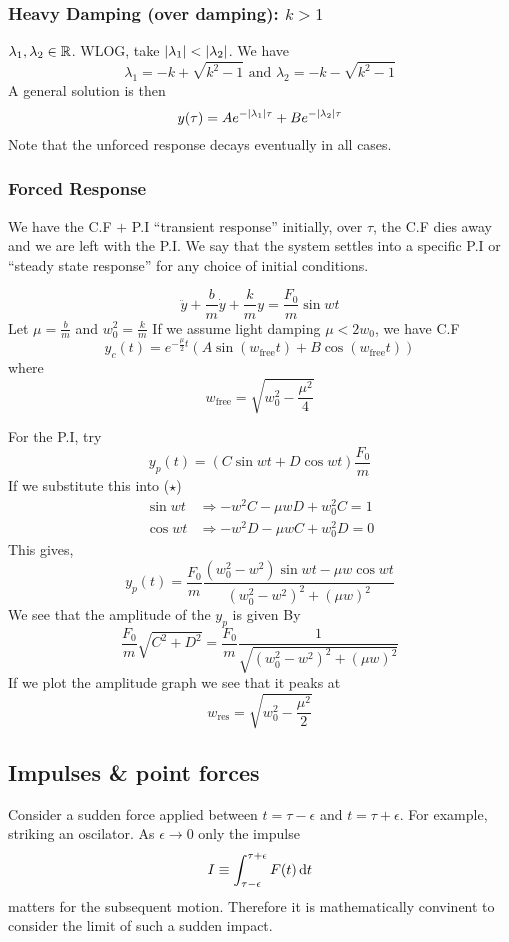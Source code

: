 \documentclass{article}
\begin{document}
\subsubsection*{Heavy Damping (over damping): $k > 1$}
$\lambda_1, \lambda_2 \in \mathbb{R}$. WLOG, take $\left\lvert \lambda_1\right\rvert < \left\lvert \lambda_2\right\rvert$. We have
\[
    \lambda_1 = -k + \sqrt{k^2 - 1} \text{ and } \lambda_2 = -k - \sqrt{k^2 - 1}
\]
A general solution is then
\[
    y(\tau) = A e^{- \left\lvert \lambda_1\right\rvert \tau} + B e^{- \left\lvert \lambda_2\right\rvert \tau}
\]
Note that the unforced response decays eventually in all cases.
\subsubsection{Forced Response}
We have the C.F $+$ P.I ``transient response'' initially, over $\tau$,
the C.F dies away and we are left with the P.I. 
We say that the system settles into a specific P.I or ``steady state response'' for any choice of initial conditions.

\begin{eg}
    \[
        \ddot{y} + \frac{b}{m} \dot{y} + \frac{k}{m} y = \frac{F_0}{m} \sin wt \tag{$\star$} 
    \]
    Let $\mu = \frac{b}{m}$ and $w_0^2 = \frac{k}{m}$
    If we assume light damping $\mu < 2 w_0$, we have C.F
    \[
        y_c(t) = e^{-\frac{\mu}{2}t} (A \sin (w_{\text{free}} t) + B \cos (w_{\text{free}} t))   
    \]
    where
    \[
        w_{\text{free}} = \sqrt{w_0^2 - \frac{\mu^2}{4}}
    \]

    For the P.I, try
    \[
        y_p(t) = (C \sin wt + D \cos wt) \frac{F_0}{m}  
    \]
    If we substitute this into ($\star$)
    \begin{align*}
        \sin wt &\Rightarrow -w^2C - \mu w D + w_0^2 C = 1 \\
        \cos wt &\Rightarrow -w^2D - \mu w C + w_0^2 D = 0
    \end{align*}
    This gives,
    \[
        y_p(t) = \frac{F_0}{m} \frac{(w_0^2 - w^2) \sin wt - \mu w \cos wt}{(w_0^2 - w^2)^2 + (\mu w)^2}  
    \]
    We see that the amplitude of the $y_p$ is given By
    \[
        \frac{F_0}{m} \sqrt{C^2 + D^2} = \frac{F_0}{m} \frac{1}{\sqrt{(w_0^2 - w^2)^2 + (\mu w)^2}}  
    \]
    If we plot the amplitude graph we see that it peaks at
    \[
        w_{\text{res}} = \sqrt{w_0^2 - \frac{\mu^2}{2}}    
    \]
\end{eg}


\subsection{Impulses \& point forces}
Consider a sudden force applied between $t = \tau - \epsilon$ and $t = \tau + \epsilon$.
For example, striking an oscilator. As $\epsilon \rightarrow 0$ only the impulse
\[
    I \equiv \int_{\tau - \epsilon}^{\tau + \epsilon}{F(t) \mathop{}\!\mathrm{d} t}    
\]
matters for the subsequent motion. 
Therefore it is mathematically convinent to consider the limit of such a sudden impact.
\end{document}
